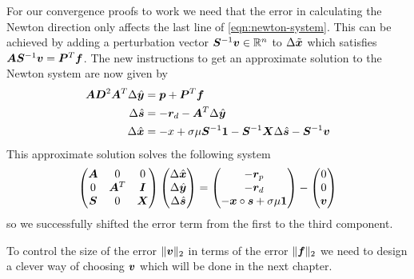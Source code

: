 For our convergence proofs to work we need that the error in calculating the Newton direction only affects the last line of \cref{eqn:newton-system}.
This can be achieved by adding a perturbation vector \(\bm{S}^{-1}\bm{v} \in \mathbb{R}^n\) to \(\Delta\tilde{\bm{x}}\) which satisfies \(\bm{A}\bm{S}^{-1}\bm{v} = \bm{P}^T \bm{f}\).
The new instructions to get an approximate solution to the Newton system are now given by
\begin{subequations}
  \begin{align}
    \bm{A} \bm{D}^2 \bm{A}^T \Delta\hat{\bm{y}} &= \bm{p} + \bm{P}^{T} \bm{f} \\
    \Delta\hat{\bm{s}} &= -\bm{r}_d - \bm{A}^T \Delta\hat{\bm{y}} \\
    \Delta\hat{\bm{x}} &= -x + \sigma \mu \bm{S}^{-1} \bm{1} - \bm{S}^{-1} \bm{X} \Delta\hat{\bm{s}} - \bm{S}^{-1} \bm{v}
  \end{align}
\end{subequations}
This approximate solution solves the following system
\begin{equation}
  \begin{pmatrix}
    \bm{A} & 0         & 0       \\
    0       & \bm{A}^T & \bm{I} \\
    \bm{S} & 0         & \bm{X} \\
  \end{pmatrix}
  \begin{pmatrix} \Delta\hat{\bm{x}} \\ \Delta\hat{\bm{y}} \\ \Delta\hat{\bm{s}} \end{pmatrix}
  =
  \begin{pmatrix} -\bm{r}_p \\ -\bm{r}_d \\ -\bm{x} \circ \bm{s} + \sigma \mu \bm{1} \end{pmatrix}
  -
  \begin{pmatrix} 0 \\ 0 \\ \bm{v} \end{pmatrix}
\end{equation}
so we successfully shifted the error term from the first to the third component.

To control the size of the error \(\lVert \bm{v} \rVert_2\) in terms of the error \(\lVert \bm{f} \rVert_2\) we need to design a clever way of choosing \(\bm{v}\) which will be done in the next chapter.